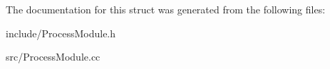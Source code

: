 The documentation for this struct was generated from the following files\+:\begin{DoxyCompactItemize}
\item 
include/Process\+Module.\+h\item 
src/Process\+Module.\+cc\end{DoxyCompactItemize}
